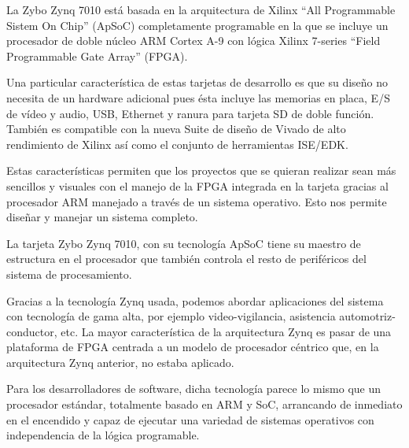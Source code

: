 La Zybo Zynq 7010 está basada en la arquitectura de Xilinx ``All Programmable Sistem On Chip'' (ApSoC) completamente programable en la que se incluye un procesador de doble núcleo ARM Cortex A-9 con lógica Xilinx 7-series ``Field Programmable Gate Array'' (FPGA).

Una particular característica de estas tarjetas de desarrollo es que su diseño no necesita de un hardware adicional pues ésta incluye las memorias en placa, E/S de vídeo y audio, USB, Ethernet y ranura para tarjeta SD de doble función. También es compatible con la nueva Suite de diseño de Vivado de alto rendimiento de Xilinx así como el conjunto de herramientas ISE/EDK.

Estas características permiten que los proyectos que se quieran realizar sean más sencillos y visuales con el manejo de la FPGA integrada en la tarjeta gracias al procesador ARM manejado a través de un sistema operativo. Esto nos permite diseñar y manejar un sistema completo.

La tarjeta Zybo Zynq 7010, con su tecnología ApSoC tiene su maestro de estructura en el procesador que también controla el resto de periféricos del sistema de procesamiento.

Gracias a la tecnología Zynq usada, podemos abordar aplicaciones del sistema con tecnología de gama alta, por ejemplo video-vigilancia, asistencia automotriz-conductor, etc. La mayor característica de la arquitectura Zynq es pasar de una plataforma de FPGA centrada a un modelo de procesador céntrico que, en la arquitectura Zynq anterior, no estaba aplicado.

Para los desarrolladores de software, dicha tecnología parece lo mismo que un procesador estándar, totalmente basado en ARM y SoC, arrancando de inmediato en el encendido y capaz de ejecutar una variedad de sistemas operativos con independencia de la lógica programable.


